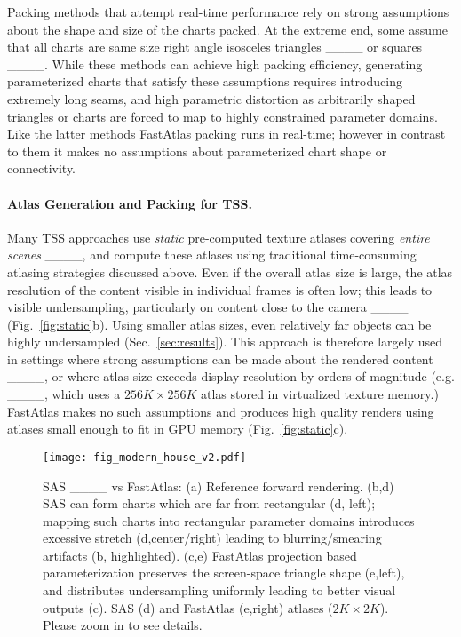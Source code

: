 Packing methods that attempt real-time performance rely on strong assumptions about the shape and size of the charts packed. At the extreme end, some assume that all charts are same size right angle isosceles triangles ____ or squares ____. While these methods can achieve high packing efficiency, generating parameterized charts that satisfy these assumptions requires introducing extremely long seams, and high parametric distortion as arbitrarily shaped triangles or charts are forced to map to highly constrained parameter domains. Like the latter methods FastAtlas packing runs in real-time; however in contrast to them it makes no assumptions about parameterized chart shape or connectivity. 

\paragraph*{Atlas Generation and Packing for TSS.} 
Many TSS approaches use {\em static} pre-computed texture atlases covering {\em entire scenes} ____,
and compute these atlases using traditional time-consuming atlasing strategies discussed above.
Even if the overall atlas size is large, the atlas resolution of the content visible in individual frames is often low; this leads to visible undersampling, particularly on content close to the camera ____ (Fig.~\ref{fig:static}b). Using smaller atlas sizes, even relatively far objects can be highly undersampled (Sec.~\ref{sec:results}). This approach is therefore largely used in settings where strong assumptions can be made about the rendered content ____, or where atlas size exceeds display resolution by orders of magnitude (e.g. ____, which uses a $256K \times 256K$ atlas stored in virtualized texture memory.) FastAtlas makes no such assumptions and produces high quality renders using atlases small enough to fit in GPU memory (Fig.~\ref{fig:static}c).

\begin{figure}
\texttt{[image: fig\_modern\_house\_v2.pdf]}
\caption{SAS ____ vs FastAtlas:  (a) Reference forward rendering. (b,d) SAS can form charts which are far from rectangular (d, left); mapping such charts into rectangular parameter domains introduces excessive stretch (d,center/right) leading to blurring/smearing artifacts (b, highlighted). (c,e) FastAtlas projection based parameterization preserves the screen-space triangle shape (e,left), and distributes undersampling uniformly leading to better visual outputs (c).  SAS (d) and FastAtlas (e,right) atlases ($2K \times 2K$). Please zoom in to see details.}
\label{fig:sas_issues}
\vspace{-5mm}
\end{figure}

